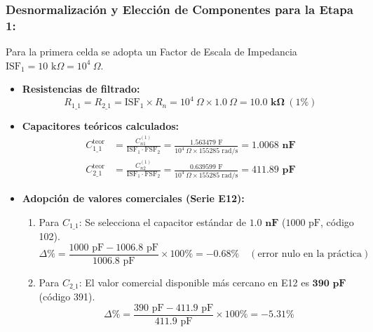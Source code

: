 \documentclass[a4paper,11pt]{article}
\begin{document}
\subsubsection{Desnormalización y Elección de Componentes para la Etapa 1:}
Para la primera celda se adopta un Factor de Escala de Impedancia $\text{ISF}_1 = 10\text{ k}\Omega = 10^4\ \Omega$.
\begin{itemize}
    \item \textbf{Resistencias de filtrado:}
    \begin{equation}
    R_{1\_1} = R_{2\_1} = \text{ISF}_1 \times R_n = 10^4\ \Omega \times 1.0\ \Omega = \mathbf{10.0\text{ k}\Omega}\ (1\%)
    \end{equation}
    \item \textbf{Capacitores teóricos calculados:}
    \begin{align}
    C_{1\_1}^{\text{teor}} &= \frac{C_{n1}^{(1)}}{\text{ISF}_1 \cdot \text{FSF}_2} = \frac{1.563479\text{ F}}{10^4\ \Omega \times 155285\text{ rad/s}} = \mathbf{1.0068\text{ nF}} \\
    C_{2\_1}^{\text{teor}} &= \frac{C_{n2}^{(1)}}{\text{ISF}_1 \cdot \text{FSF}_2} = \frac{0.639599\text{ F}}{10^4\ \Omega \times 155285\text{ rad/s}} = \mathbf{411.89\text{ pF}}
    \end{align}
    \item \textbf{Adopción de valores comerciales (Serie E12):}
    \begin{enumerate}
        \item Para $C_{1\_1}$: Se selecciona el capacitor estándar de $\mathbf{1.0\text{ nF}}$ ($1000\text{ pF}$, código 102).
        \begin{equation*}
        \Delta\% = \frac{1000\text{ pF} - 1006.8\text{ pF}}{1006.8\text{ pF}} \times 100\% = \mathbf{-0.68\%}\quad (\text{error nulo en la práctica})
        \end{equation*}
        \item Para $C_{2\_1}$: El valor comercial disponible más cercano en E12 es $\mathbf{390\text{ pF}}$ (código 391).
        \begin{equation*}
        \Delta\% = \frac{390\text{ pF} - 411.9\text{ pF}}{411.9\text{ pF}} \times 100\% = \mathbf{-5.31\%}
        \end{equation*}
    \end{enumerate}
\end{itemize}
\end{document}
